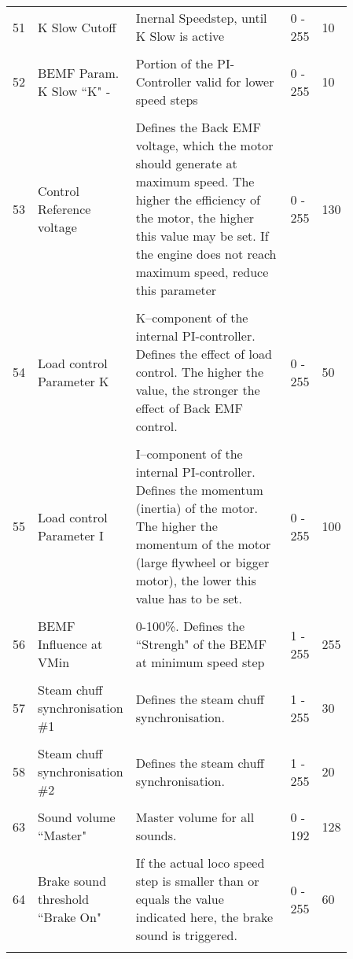 \begin{tabular}{p{0.075\linewidth} p{0.15\linewidth} p{0.525\linewidth} p{0.06\linewidth} p{0.05\linewidth}}
\\
51 & K Slow Cutoff & Inernal Speedstep, until K Slow is active & 0 - 255 & 10\\
\\
52 & BEMF Param. K Slow ``K" -& Portion of the PI-Controller valid for lower speed steps & 0 - 255 & 10\\
\\
53 & Control Reference voltage & Defines the Back EMF voltage, which the motor should generate at maximum speed. The higher the efficiency of the motor, the higher this value may be set. If the engine does not reach maximum speed, reduce this parameter & 0 - 255 & 130\\
\\
54 & Load control Parameter K & K–component of the internal PI-controller. Defines the effect of load control. The higher the value, the stronger the effect of Back EMF control. & 0 - 255 & 50\\
\\
55 & Load control Parameter I  & I–component of the internal PI-controller. Defines the momentum (inertia) of the motor. The higher the momentum of the motor (large flywheel or bigger motor), the lower this value has to be set. & 0 - 255 & 100\\
\\
56 & BEMF Influence at VMin & 0-100\%. Defines the ``Strengh" of the BEMF at minimum speed step & 1 - 255 & 255\\
\\
57 & Steam chuff synchronisation \#1 & Defines the steam chuff synchronisation. & 1 - 255 & 30\\
\\
58 & Steam chuff synchronisation \#2 & Defines the steam chuff synchronisation. & 1 - 255 & 20\\
\\
63 & Sound volume ``Master" & Master volume for all sounds. & 0 - 192 & 128\\
\\
64 & Brake sound threshold ``Brake On" & If the actual loco speed step is smaller than or equals the value indicated here, the brake sound is triggered. & 0 - 255 & 60\\
\\
\end{tabular}
\newpage
